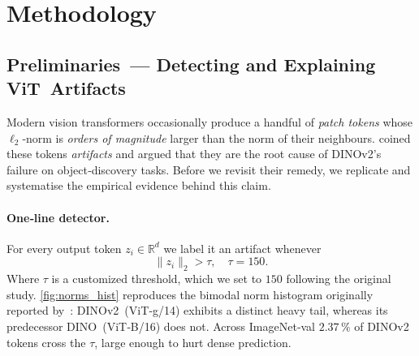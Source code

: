 \documentclass{article}
\newcommand{\citet}{\textcite}
\begin{document}
\section{Methodology}
\label{sec:method}



\subsection{Preliminaries — Detecting and Explaining ViT Artifacts}
\label{sec:prelim}

Modern vision transformers occasionally produce a handful of \emph{patch tokens} whose $\ell_2$‑norm is \emph{orders of magnitude} larger than the norm of their neighbours.  
\citet{darcetVisionTransformersNeed2024} coined these tokens \emph{artifacts} and argued that they are the root cause of DINOv2’s failure on object‑discovery tasks.
Before we revisit their remedy, we replicate and systematise the empirical evidence behind this claim.

\paragraph{One‑line detector.}
For every output token $z_i\!\in\!\mathbb R^{d}$ we label it an artifact whenever 
\begin{equation}
\|z_i\|_{2}>\tau, \quad \tau=150.
\end{equation}
Where $\tau$ is a customized threshold, which we set to $150$ following the original study. \cref{fig:norms_hist} reproduces the bimodal norm histogram originally reported by \citet{darcetVisionTransformersNeed2024}:
DINOv2 (ViT‑g/14) exhibits a distinct heavy tail, whereas its predecessor DINO (ViT‑B/16) does not.
Across ImageNet‑val $2.37\,\%$ of DINOv2 tokens cross the $\tau$, large enough to hurt dense prediction.
\end{document}
